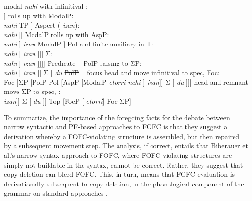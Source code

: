 \documentclass[output=paper]{langscibook}
\begin{document}
\ea \label{ex:haddican:49} 
\ea \label{ex:haddican:49a}  modal \textit{nahi} with infinitival :\\\relax
[ModalP \textit{nahi} [\isi{TP} \textit{etorri} ]]  
\ex {}  rolls up with ModalP:\\\relax
 [ModalP [\isi{TP} \textit{etorri}] \textit{nahi} \st{TP} ]
\ex {} Aspect ( \textit{izan}):\\\relax
 [AspP \textit{izan} [ModalP [\isi{TP} \textit{etorri} ] \textit{nahi}  ]] 
\ex ModalP rolls up with AspP:\\\relax
 [AspP [ModalP [\isi{TP} \textit{etorri} ] \textit{nahi} ]  \textit{izan} \st{ModalP}  ]
\ex {} Pol and finite auxiliary in T:\\\relax
 [\isi{TP} \textit{du} [PolP Pol\is{polarity} [AspP [ModalP [\isi{TP} \textit{etorri} ] \textit{nahi} ]  \textit{izan}   ]]]
\ex {} Σ:\\\relax
 [ΣP Σ [\isi{TP} \textit{du} [PolP Pol\is{polarity} [AspP [ModalP [\isi{TP} \textit{etorri} ] \textit{nahi} ]  \textit{izan} ]]]]
\ex Predicate  -- PolP raising to ΣP:\\\relax
 [ΣP  [PolP Pol\is{polarity} [AspP [ModalP [\isi{TP} \textit{etorri} ] \textit{nahi} ]  \textit{izan}   ]] Σ [ \textit{du} \st{PolP} ]]
\ex {} focus head and move infinitival  to spec, Foc:\\\relax
 [FocP [\isi{TP} \textit{etorri}] Foc [ΣP [PolP Pol [AspP [ModalP \st{\textit{etorri}} \textit{nahi} ]  \textit{izan}]] Σ [ \textit{du} ]]]
\ex {}  head and remnant move ΣP to spec, :\\\relax
 [TopP   [ΣP [PolP Pol\is{polarity} [AspP [ModalP  \textit{nahi} ]  \textit{izan}]] Σ [ \textit{du} ]] Top [FocP [ \textit{etorri}] Foc \st{ΣP}]
\z\z

To summarize, the importance of the foregoing facts for the debate between narrow syntactic and PF-based approaches to FOFC is that they suggest a derivation whereby a FOFC-violating structure is assembled, but then repaired by a subsequent movement step. The analysis, if correct, entails that Biberauer et al.'s narrow-syntax approach to FOFC, where FOFC-violating structures are simply not buildable in the syntax, cannot be correct. Rather, they suggest that copy-deletion can bleed FOFC. This, in turn, means that FOFC-evaluation is derivationally subsequent to copy-deletion, in the phonological component of the grammar on standard approaches \citep{Nunes2004}.
	
\end{document}

